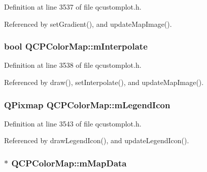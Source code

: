 Definition at line 3537 of file qcustomplot.\+h.



Referenced by set\+Gradient(), and update\+Map\+Image().

\hypertarget{class_q_c_p_color_map_af77e5eba9a844592648edeb6fbe834f1}{}
\subsubsection[{m\+Interpolate}]{\setlength{\rightskip}{0pt plus 5cm}bool Q\+C\+P\+Color\+Map\+::m\+Interpolate\hspace{0.3cm}{\ttfamily [protected]}}\label{class_q_c_p_color_map_af77e5eba9a844592648edeb6fbe834f1}


Definition at line 3538 of file qcustomplot.\+h.



Referenced by draw(), set\+Interpolate(), and update\+Map\+Image().

\hypertarget{class_q_c_p_color_map_ada522988db02cb531767d38c5029ef60}{}
\subsubsection[{m\+Legend\+Icon}]{\setlength{\rightskip}{0pt plus 5cm}Q\+Pixmap Q\+C\+P\+Color\+Map\+::m\+Legend\+Icon\hspace{0.3cm}{\ttfamily [protected]}}\label{class_q_c_p_color_map_ada522988db02cb531767d38c5029ef60}


Definition at line 3543 of file qcustomplot.\+h.



Referenced by draw\+Legend\+Icon(), and update\+Legend\+Icon().

\hypertarget{class_q_c_p_color_map_a8709272aa8f0be3ca111bf3866806f8b}{}
\subsubsection[{m\+Map\+Data}]{$\ast$ Q\+C\+P\+Color\+Map\+::m\+Map\+Data\hspace{0.3cm}{\ttfamily [protected]}}\label{class_q_c_p_color_map_a8709272aa8f0be3ca111bf3866806f8b}



